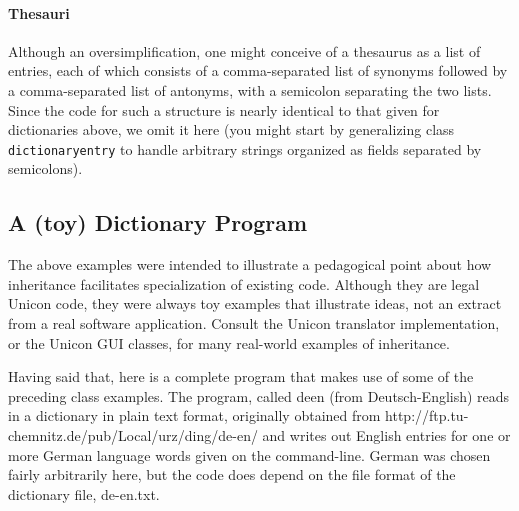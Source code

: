 \paragraph{Thesauri}
Although an oversimplification, one might conceive of a thesaurus as a
list of entries, each of which consists of a comma-separated list of
synonyms followed by a comma-separated list of antonyms, with a
semicolon separating the two lists. Since the code for such a structure
is nearly identical to that given for dictionaries above, we omit it
here (you might start by generalizing class \texttt{dictionaryentry} to
handle arbitrary strings organized as fields separated by semicolons).


\subsection*{A (toy) Dictionary Program}

The above examples were intended to illustrate a pedagogical point
about how inheritance facilitates specialization of existing code.
Although they are legal Unicon code, they were always toy examples
that illustrate ideas, not an extract from a real software
application.  Consult the Unicon translator implementation, or
the Unicon GUI classes, for many real-world examples of inheritance.

Having said that, here is a complete program that makes use of some
of the preceding class examples.  The program, called deen (from
Deutsch-English) reads in a dictionary in plain text format,
originally obtained from
http://ftp.tu-chemnitz.de/pub/Local/urz/ding/de-en/
and writes out English entries for one or more German language words
given on the command-line. German was chosen fairly arbitrarily here,
but the code does depend on the file format of the dictionary file,
de-en.txt.


